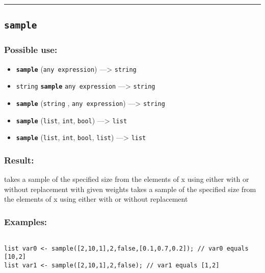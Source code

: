 \documentclass[]{book}
\providecommand{\tightlist}{%
  \setlength{\itemsep}{0pt}\setlength{\parskip}{0pt}}
\theoremstyle{definition}
\theoremstyle{definition}
\theoremstyle{definition}
\theoremstyle{remark}
\begin{document}
\begin{center}\rule{0.5\linewidth}{\linethickness}\end{center}

\subsection{\texorpdfstring{\texttt{sample}}{sample}}\label{sample}

\subsubsection{Possible use:}\label{possible-use-448}

\begin{itemize}
\tightlist
\item
  \textbf{\texttt{sample}} (\texttt{any\ expression}) ---\textgreater{}
  \texttt{string}
\item
  \texttt{string} \textbf{\texttt{sample}} \texttt{any\ expression}
  ---\textgreater{} \texttt{string}
\item
  \textbf{\texttt{sample}} (\texttt{string} , \texttt{any\ expression})
  ---\textgreater{} \texttt{string}
\item
  \textbf{\texttt{sample}} (\texttt{list}, \texttt{int}, \texttt{bool})
  ---\textgreater{} \texttt{list}
\item
  \textbf{\texttt{sample}} (\texttt{list}, \texttt{int}, \texttt{bool},
  \texttt{list}) ---\textgreater{} \texttt{list}
\end{itemize}

\subsubsection{Result:}\label{result-434}

takes a sample of the specified size from the elements of x using either
with or without replacement with given weights takes a sample of the
specified size from the elements of x using either with or without
replacement

\subsubsection{Examples:}\label{examples-309}

\begin{verbatim}
 
list var0 <- sample([2,10,1],2,false,[0.1,0.7,0.2]); // var0 equals [10,2] 
list var1 <- sample([2,10,1],2,false); // var1 equals [1,2]
\end{verbatim}
\end{document}
